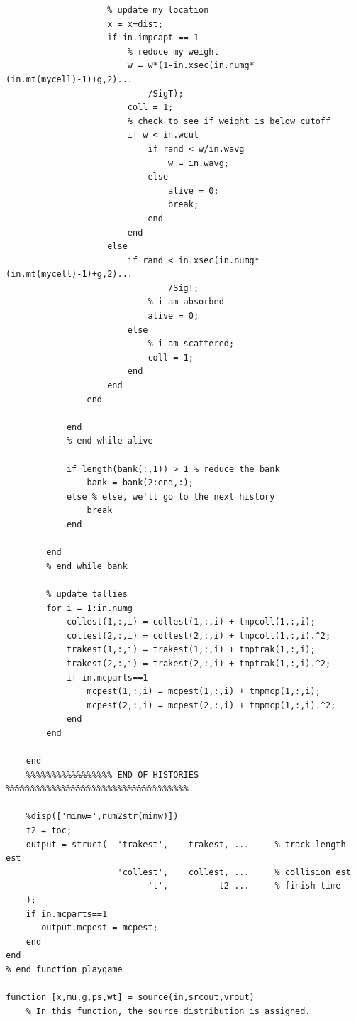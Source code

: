 \documentclass[letter,11pt]{article}
\begin{document}
{\begin{verbatim}
                    % update my location
                    x = x+dist;
                    if in.impcapt == 1
                        % reduce my weight
                        w = w*(1-in.xsec(in.numg*(in.mt(mycell)-1)+g,2)...
                            /SigT);
                        coll = 1;
                        % check to see if weight is below cutoff
                        if w < in.wcut
                            if rand < w/in.wavg
                                w = in.wavg;
                            else
                                alive = 0;
                                break;
                            end
                        end
                    else
                        if rand < in.xsec(in.numg*(in.mt(mycell)-1)+g,2)...
                                /SigT;
                            % i am absorbed
                            alive = 0;
                        else
                            % i am scattered;
                            coll = 1;
                        end
                    end
                end

            end
            % end while alive
            
            if length(bank(:,1)) > 1 % reduce the bank
                bank = bank(2:end,:);
            else % else, we'll go to the next history
                break
            end
            
        end
        % end while bank
        
        % update tallies
        for i = 1:in.numg
            collest(1,:,i) = collest(1,:,i) + tmpcoll(1,:,i);
            collest(2,:,i) = collest(2,:,i) + tmpcoll(1,:,i).^2;
            trakest(1,:,i) = trakest(1,:,i) + tmptrak(1,:,i);
            trakest(2,:,i) = trakest(2,:,i) + tmptrak(1,:,i).^2;
            if in.mcparts==1
                mcpest(1,:,i) = mcpest(1,:,i) + tmpmcp(1,:,i);
                mcpest(2,:,i) = mcpest(2,:,i) + tmpmcp(1,:,i).^2;
            end
        end

    end
    %%%%%%%%%%%%%%%%% END OF HISTORIES %%%%%%%%%%%%%%%%%%%%%%%%%%%%%%%%%%%%
    
	%disp(['minw=',num2str(minw)])  
	t2 = toc;
	output = struct(  'trakest',    trakest, ...     % track length est
                      'collest',    collest, ...     % collision est
                            't',          t2 ...     % finish time
	);    
    if in.mcparts==1
       output.mcpest = mcpest; 
    end
end
% end function playgame

function [x,mu,g,ps,wt] = source(in,srcout,vrout)
	% In this function, the source distribution is assigned.
 

\end{verbatim}}
\end{document}

